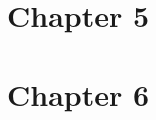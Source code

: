 \documentclass[12pt, oneside]{article}
\begin{document}
\section{Chapter 5}
\newpage


\section{Chapter 6}
\newpage
%
%
\newpage
\end{document}
